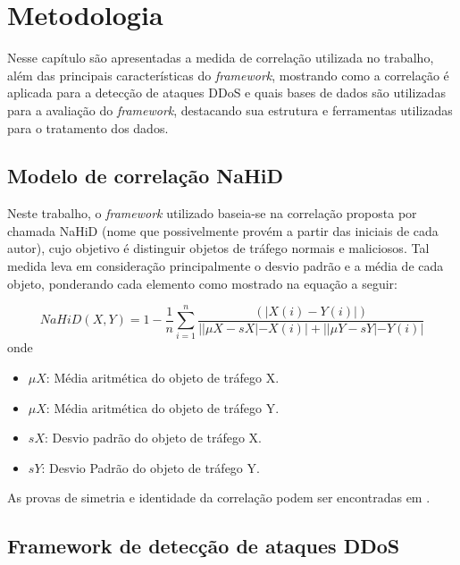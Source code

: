 \chapter[Metodologia]{Metodologia}
\label{metodologia}
Nesse capítulo são apresentadas a medida de correlação utilizada no trabalho, além das principais características do \textit{framework}, mostrando como a correlação é aplicada
para a detecção de ataques DDoS e quais bases de dados são utilizadas para a avaliação do \textit{framework}, destacando sua estrutura e ferramentas utilizadas para o tratamento dos dados. 

\section{Modelo de correlação NaHiD}

Neste trabalho, o \textit{framework} utilizado baseia-se na correlação proposta por \cite{HOQUE201748} chamada NaHiD (nome que possivelmente provém a partir das iniciais de cada autor), cujo objetivo é distinguir objetos de tráfego normais e maliciosos. Tal medida leva em consideração principalmente o desvio padrão e a média de cada objeto, ponderando cada elemento como mostrado na equação a seguir:  

\begin{equation}
	NaHiD(X,Y) = 1 - \frac{1}{n} \sum_{i=1}^{n} \frac{\left(|X(i) -	 Y(i)|\right)}{||\mu{X} - sX| - X(i)| + ||\mu{Y} - sY| - Y(i)|}
\end{equation}
onde
\begin{itemize}
	\item $\mu{X}$: Média aritmética do objeto de tráfego X.
 	\item $\mu{X}$: Média aritmética do objeto de tráfego Y.
	\item $sX$: Desvio padrão do objeto de tráfego X.
	\item $sY$: Desvio Padrão do objeto de tráfego Y.
\end{itemize}
As provas de simetria e identidade da correlação podem ser encontradas em \cite{HOQUE201748}.

\section{Framework de detecção de ataques DDoS}

